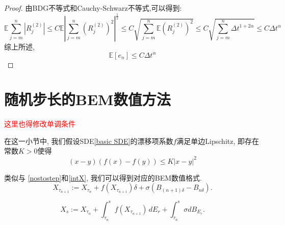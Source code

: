 \begin{proof}
	由BDG不等式和Cauchy-Schwarz不等式,可以得到:
	\begin{equation*}
		\mathbb{E}\sum_{j=m}^{n}\left|R_{j}^{(2)}\right|  \le C\mathbb{E} \left|\sum_{j=m}^{n}(R_{j}^{(2)})^2\right|^{\frac{1}{2}} \le C\sqrt{\sum_{j=m}^{n}\mathbb{E}(R_{j}^{(2)})^2}
		\le C\sqrt{\sum_{j=m}^{n}\Delta t^{1+2\alpha}} \le C\Delta t^{\alpha}
	\end{equation*}
	综上所述,
	\begin{equation*}
		\mathbb{E} [e_n] \leq C\Delta t^\alpha
	\end{equation*}
\end{proof}


\section{随机步长的BEM数值方法}
\textcolor{red}{这里也得修改单调条件}
\begin{assumption}\label{Local Lipschitz}
	在这一小节中, 我们假设SDE\cref{basic SDE}的漂移项系数$f$满足单边Lipschitz, 即存在常数$K>0$使得
	\begin{equation}
		(x-y)(f(x)-f(y)) \le K|x-y|^2
	\end{equation}
\end{assumption}

类似与 \textnormal{\cref{nostostep}}和\textnormal{\cref{intX}},
我们可以得到对应的BEM数值格式.
\begin{equation}\label{nostostepY}
	X_{\tau_{n+1}} :=X_{\tau_n}  + f\left(X_{\tau_{n+1}}\right)\delta + \sigma\left(B_{(n+1)\delta}-B_{n\delta}\right).
\end{equation}

\begin{equation}\label{intY}
	X_s:= X_{\tau_n} +  \int_{\tau_n}^s f\left(X_{\tau_{n+1}}\right) \, dE_r + \int_{\tau_n}^s \sigma dB_{E_r}.
\end{equation}


